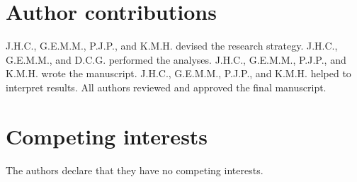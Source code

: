 \documentclass[english, 10pt, letterpaper]{article}
\begin{document}
\section*{Author contributions}

J.H.C., G.E.M.M., P.J.P., and K.M.H. devised the research strategy. 
J.H.C., G.E.M.M., and D.C.G. performed the analyses. 
J.H.C., G.E.M.M., P.J.P., and K.M.H. wrote the manuscript. 
J.H.C., G.E.M.M., P.J.P., and K.M.H. helped to interpret results. 
All authors reviewed and approved the final manuscript.

\section*{Competing interests}

The authors declare that they have no competing interests.





{}

\newpage


\end{document}
